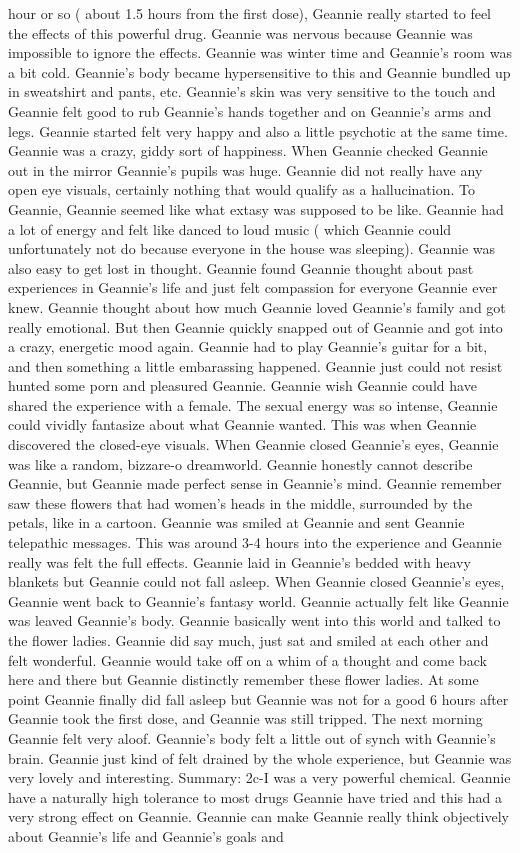 \documentclass[12pt]{book}
\begin{document}
hour or so ( about 1.5 hours from the first dose), Geannie really started to feel the effects of this powerful drug. Geannie was nervous because Geannie was impossible to ignore the effects. Geannie was winter time and Geannie's room was a bit cold. Geannie's body became hypersensitive to this and Geannie bundled up in sweatshirt and pants, etc. Geannie's skin was very sensitive to the touch and Geannie felt good to rub Geannie's hands together and on Geannie's arms and legs. Geannie started felt very happy and also a little psychotic at the same time. Geannie was a crazy, giddy sort of happiness. When Geannie checked Geannie out in the mirror Geannie's pupils was huge. Geannie did not really have any open eye visuals, certainly nothing that would qualify as a hallucination. To Geannie, Geannie seemed like what extasy was supposed to be like. Geannie had a lot of energy and felt like danced to loud music ( which Geannie could unfortunately not do because everyone in the house was sleeping). Geannie was also easy to get lost in thought. Geannie found Geannie thought about past experiences in Geannie's life and just felt compassion for everyone Geannie ever knew. Geannie thought about how much Geannie loved Geannie's family and got really emotional. But then Geannie quickly snapped out of Geannie and got into a crazy, energetic mood again. Geannie had to play Geannie's guitar for a bit, and then something a little embarassing happened. Geannie just could not resist hunted some porn and pleasured Geannie. Geannie wish Geannie could have shared the experience with a female. The sexual energy was so intense, Geannie could vividly fantasize about what Geannie wanted. This was when Geannie discovered the closed-eye visuals. When Geannie closed Geannie's eyes, Geannie was like a random, bizzare-o dreamworld. Geannie honestly cannot describe Geannie, but Geannie made perfect sense in Geannie's mind. Geannie remember saw these flowers that had women's heads in the middle, surrounded by the petals, like in a cartoon. Geannie was smiled at Geannie and sent Geannie telepathic messages. This was around 3-4 hours into the experience and Geannie really was felt the full effects. Geannie laid in Geannie's bedded with heavy blankets but Geannie could not fall asleep. When Geannie closed Geannie's eyes, Geannie went back to Geannie's fantasy world. Geannie actually felt like Geannie was leaved Geannie's body. Geannie basically went into this world and talked to the flower ladies. Geannie did say much, just sat and smiled at each other and felt wonderful. Geannie would take off on a whim of a thought and come back here and there but Geannie distinctly remember these flower ladies. At some point Geannie finally did fall asleep but Geannie was not for a good 6 hours after Geannie took the first dose, and Geannie was still tripped. The next morning Geannie felt very aloof. Geannie's body felt a little out of synch with Geannie's brain. Geannie just kind of felt drained by the whole experience, but Geannie was very lovely and interesting. Summary: 2c-I was a very powerful chemical. Geannie have a naturally high tolerance to most drugs Geannie have tried and this had a very strong effect on Geannie. Geannie can make Geannie really think objectively about Geannie's life and Geannie's goals and 
\end{document}
